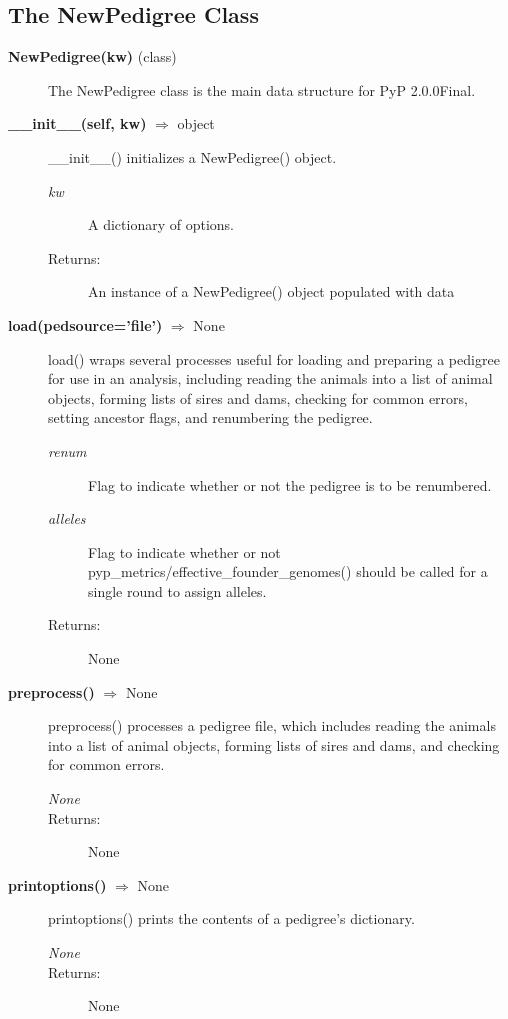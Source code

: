 \subsection*{The NewPedigree Class}
\begin{description}
\item[\textbf{NewPedigree(kw)} (class)]
The NewPedigree class is the main data structure for PyP 2.0.0Final.

\item[\textbf{\_\_init\_\_(self, kw)} $\Rightarrow$ object]
\_\_init\_\_() initializes a NewPedigree() object.
\begin{description}
\item[\emph{kw}] A dictionary of options.
\item[Returns:] An instance of a NewPedigree() object populated with data
\end{description}

\item[\textbf{load(pedsource='file')} $\Rightarrow$ None]
load() wraps several processes useful for loading and preparing a pedigree for use in an analysis, including reading the animals into a list of animal objects, forming lists of sires and dams, checking for common errors, setting ancestor flags, and renumbering the pedigree.
\begin{description}
\item[\emph{renum}] Flag to indicate whether or not the pedigree is to be renumbered.
\item[\emph{alleles}] Flag to indicate whether or not pyp\_metrics/effective\_founder\_genomes() should be called for a single round to assign alleles.
\item[Returns:] None
\end{description}

\item[\textbf{preprocess()} $\Rightarrow$ None]
preprocess() processes a pedigree file, which includes reading the animals into a list of animal objects, forming lists of sires and dams, and checking for common errors.
\begin{description}
\item[\emph{None}]
\item[Returns:] None
\end{description}

\item[\textbf{printoptions()} $\Rightarrow$ None]
printoptions() prints the contents of a pedigree's  dictionary.
\begin{description}
\item[\emph{None}]
\item[Returns:] None
\end{description}


\end{description}
